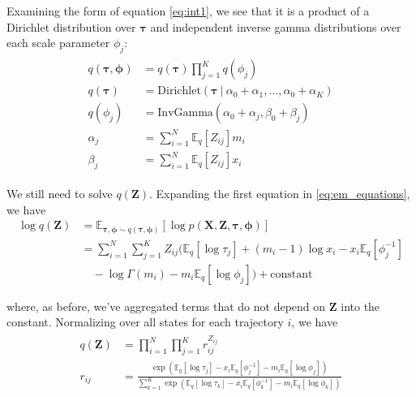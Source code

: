 \documentclass{article}
\let\vec\boldsymbol
\begin{document}
Examining the form of equation \ref{eq:int1}, we see that it is a product
of a Dirichlet distribution over $\boldsymbol{\tau}$ and independent inverse
gamma distributions over each scale parameter $\phi_{j}$:
\begin{align}\begin{split}\label{eq:int2}
    q \left( \boldsymbol{\tau}, \boldsymbol{\phi} \right) &= q \left( \boldsymbol{\tau} \right) \prod\limits_{j=1}^{K} q \left( \phi_{j} \right) \\
    q \left( \boldsymbol{\tau} \right) &= \text{Dirichlet} \left( \boldsymbol{\tau} \ | \ \alpha_{0} + \alpha_{1}, ..., \alpha_{0} + \alpha_{K} \right) \\
    q \left( \phi_{j} \right) &= \text{InvGamma} \left(
        \alpha_{0} + \alpha_{j}, \beta_{0} + \beta_{j}
    \right) \\
    \alpha_{j} &= \sum\limits_{i=1}^{N} \mathbb{E}_{q} \left[ Z_{ij} \right] m_{i} \\
    \beta_{j} &= \sum\limits_{i=1}^{N} \mathbb{E}_{q} \left[ Z_{ij} \right] x_{i}
\end{split}\end{align}

We still need to solve $q(\vec{Z})$. Expanding the first equation
in \ref{eq:em_equations}, we have
\begin{align*}
    \log q \left( \vec{Z} \right) &= \mathbb{E}_{\boldsymbol{\tau}, \boldsymbol{\phi} \sim q (\boldsymbol{\tau}, \boldsymbol{\phi})} \left[ \log p \left( \vec{X}, \vec{Z}, \boldsymbol{\tau}, \boldsymbol{\phi} \right) \right] \\
    &= \sum\limits_{i=1}^{N} \sum\limits_{j=1}^{K} Z_{ij} \Big(
        \mathbb{E}_{q} \left[ \log \tau_{j} \right] + (m_{i}-1) \log x_{i} - x_{i} \mathbb{E}_{q} \left[ \phi_{j}^{-1} \right] \\
    &\quad - \log \Gamma (m_{i}) - m_{i} \mathbb{E}_{q} \left[ \log \phi_{j} \right] \Big) + \text{constant}
\end{align*}

where, as before, we've aggregated terms that do not depend on $\vec{Z}$
into the constant.
Normalizing over all states for each trajectory $i$, we have
\begin{align}\begin{split}\label{eq:int3}
    q \left( \vec{Z} \right) &= \prod\limits_{i=1}^{N} \prod\limits_{j=1}^{K} r_{ij}^{Z_{ij}} \\
    r_{ij} &= \frac{
        \exp \left(
            \mathbb{E}_{q} \left[ \log \tau_{j} \right] - x_{i} \mathbb{E}_{q} \left[ \phi_{j}^{-1} \right] - m_{i} \mathbb{E}_{q} \left[ \log \phi_{j} \right]
        \right)
    }{
        \sum\limits_{k=1}^{K} \exp \left(
            \mathbb{E}_{q} \left[ \log \tau_{k} \right] - x_{i} \mathbb{E}_{q} \left[ \phi_{k}^{-1} \right] - m_{i} \mathbb{E}_{q} \left[ \log \phi_{k} \right]
        \right)
    }
\end{split}\end{align}
\end{document}
